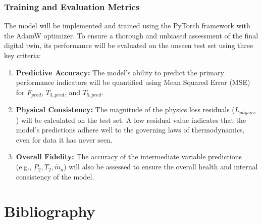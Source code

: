 \documentclass[
  12pt,
  oneside,
  a4paper,
  english,
  brazil]{abntex2}
\providecommand{\tightlist}{%
  \setlength{\itemsep}{0pt}\setlength{\parskip}{0pt}}
\begin{document}
\subsection{Training and Evaluation
Metrics}\label{training-and-evaluation-metrics}

The model will be implemented and trained using the PyTorch framework
with the AdamW optimizer. To ensure a thorough and unbiased assessment
of the final digital twin, its performance will be evaluated on the
unseen test set using three key criteria:

\begin{enumerate}
\def\labelenumi{\arabic{enumi}.}
\tightlist
\item
  \textbf{Predictive Accuracy:} The model's ability to predict the
  primary performance indicators will be quantified using Mean Squared
  Error (MSE) for \(F_{pred}\), \(T_{3,pred}\), and \(T_{5,pred}\).
\item
  \textbf{Physical Consistency:} The magnitude of the physics loss
  residuals (\(L_{physics}\)) will be calculated on the test set. A low
  residual value indicates that the model's predictions adhere well to
  the governing laws of thermodynamics, even for data it has never seen.
\item
  \textbf{Overall Fidelity:} The accuracy of the intermediate variable
  predictions (e.g., \(P_2, T_2, \dot{m}_a\)) will also be assessed to
  ensure the overall health and internal consistency of the model.
\end{enumerate}

\backmatter

\newpage
\chapter*{\textbf{Bibliography}}
\end{document}
